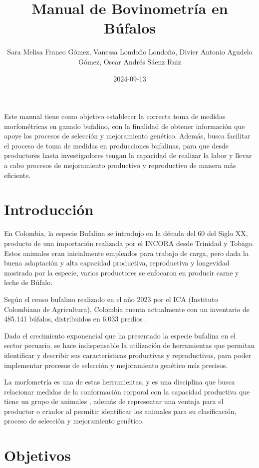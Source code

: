 \documentclass[
]{book}
\title{Manual de Bovinometría en Búfalos}
\author{Sara Melisa Franco Gómez, Vanessa Londoño Londoño, Divier Antonio Agudelo Gómez, Oscar Andrés Sáenz Ruiz}
\date{2024-09-13}
\begin{document}
\maketitle

{
\setcounter{tocdepth}{1}
\tableofcontents
}
Este manual tiene como objetivo establecer la correcta
toma de medidas morfométricas en ganado bufalino,
con la finalidad de obtener información que apoye los
procesos de selección y mejoramiento genético.
Además, busca facilitar el proceso de toma de medidas
en producciones bufalinas, para que desde productores hasta
investigadores tengan la capacidad de realizar la labor y llevar
a cabo procesos de mejoramiento productivo y reproductivo de manera más
eficiente.

\chapter{Introducción}\label{introducciuxf3n}

En Colombia, la especie Bufalina se introdujo en la década del 60 del Siglo XX, producto de una importación realizada por el INCORA desde Trinidad y Tobago. Estos animales eran inicialmente empleados para trabajo de carga, pero dada la buena adaptación y alta capacidad productiva, reproductiva y longevidad mostrada por la especie, varios productores se enfocaron en producir carne y leche de Búfalo.

Según el censo bufalino realizado en el año 2023 por el ICA (Instituto Colombiano de Agricultura), Colombia cuenta actualmente con un inventario de 485.141 búfalos, distribuidos en 6.033 predios \citep{ICA2022}.

Dado el crecimiento exponencial que ha presentado la especie bufalina en el sector pecuario, se hace indispensable la utilización de herramientas que permitan identificar y describir sus características productivas y reproductivas, para poder implementar procesos de selección y mejoramiento genético más precisos.

La morfometría es una de estas herramientas, y es una disciplina que busca relacionar medidas de la conformación corporal con la capacidad productiva que tiene un grupo de animales \citep{Cardenas2018}, además de representar una ventaja para el productor o criador al permitir identificar los animales para su clasificación, proceso de selección y mejoramiento genético.

\chapter{Objetivos}\label{objetivos}
\end{document}
